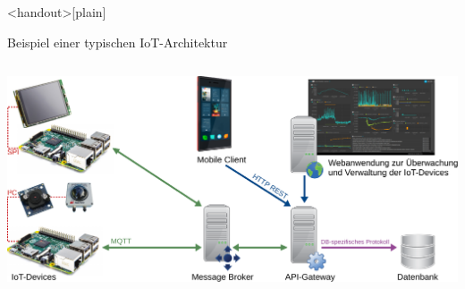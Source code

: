 {

\begin{frame}<handout>[plain]
\end{frame}
}

\begin{frame}{Beispiel einer typischen IoT-Architektur}
    \begin{columns}
        \column{\dimexpr\paperwidth-10pt}
        \includegraphics[width=\textwidth]{1-grundlagen/img/architektur_beispiel}
    \end{columns}
\end{frame}

